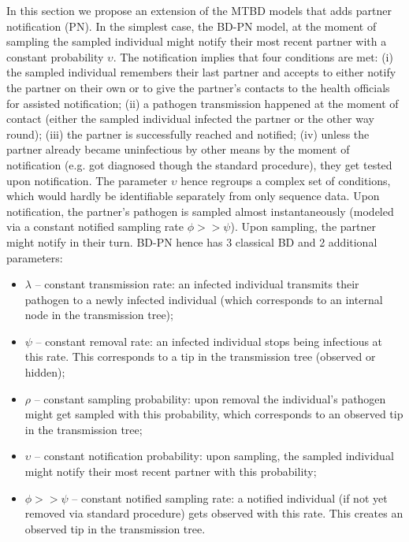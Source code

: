 \documentclass[a4paper,10pt]{article}
\begin{document}
In this section we propose an %
extension of the MTBD models that adds partner notification (PN).  In the simplest case, the BD-PN model, at the moment of sampling the sampled individual might notify their most recent partner with a constant probability $\upsilon$. The notification implies that four conditions are met: (i) the sampled individual remembers their last partner and accepts to either notify the partner on their own or to give the partner's contacts to the health officials for assisted notification; (ii) a pathogen transmission happened at the moment of contact (either the sampled individual infected the partner or the other way round); (iii) the partner is successfully reached and notified; (iv) unless the partner already became uninfectious by other means by the moment of notification (e.g. got diagnosed though the standard procedure), they get tested upon notification. The parameter $\upsilon$ hence regroups a complex set of conditions, which would hardly be identifiable separately from only sequence data. Upon notification, the partner's pathogen is sampled almost instantaneously (modeled via a constant notified sampling rate $\phi >> \psi$). Upon sampling, the partner might notify in their turn. BD-PN hence has 3 classical BD and 2 additional parameters:
\begin{itemize}
 \item $\lambda$ -- constant transmission rate: an infected individual transmits their pathogen to a newly infected individual (which corresponds to an internal node in the transmission tree);
 \item $\psi$ -- constant removal rate: an infected individual stops being infectious at this rate. This corresponds to a tip in the transmission tree (observed or hidden);
 \item $\rho$ -- constant sampling probability: upon removal the individual's pathogen might get sampled with this probability, which corresponds to an observed tip in the transmission tree;
 \item $\upsilon$ -- constant notification probability: upon sampling, the sampled individual might notify their most recent partner with this probability;
 \item $\phi >> \psi$ -- constant notified sampling rate: a notified individual (if not yet removed via standard procedure) gets observed with this rate. This creates an observed tip in the transmission tree. 
\end{itemize}
\end{document}
